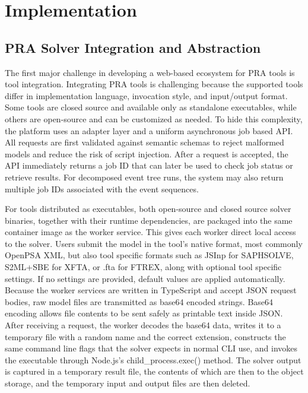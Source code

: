 \chapter{Implementation}

\section{PRA Solver Integration and Abstraction}
The first major challenge in developing a web-based ecosystem for PRA tools is tool integration. Integrating PRA tools is challenging because the supported tools differ in implementation language, invocation style, and input/output format. Some tools are closed source and available only as standalone executables, while others are open-source and can be customized as needed. To hide this complexity, the platform uses an adapter layer and a uniform asynchronous job based API. All requests are first validated against semantic schemas to reject malformed models and reduce the risk of script injection. After a request is accepted, the API immediately returns a job ID that can later be used to check job status or retrieve results. For decomposed event tree runs, the system may also return multiple job IDs associated with the event sequences.

For tools distributed as executables, both open-source and closed source solver binaries, together with their runtime dependencies, are packaged into the same container image as the worker service. This gives each worker direct local access to the solver. Users submit the model in the tool's native format, most commonly OpenPSA XML, but also tool specific formats such as JSInp for SAPHSOLVE, S2ML+SBE for XFTA, or .fta for FTREX, along with optional tool specific settings. If no settings are provided, default values are applied automatically. Because the worker services are written in TypeScript and accept JSON request bodies, raw model files are transmitted as base64 encoded strings. Base64 encoding allows file contents to be sent safely as printable text inside JSON. After receiving a request, the worker decodes the base64 data, writes it to a temporary file with a random name and the correct extension, constructs the same command line flags that the solver expects in normal CLI use, and invokes the executable through Node.js's child\_process.exec() method. The solver output is captured in a temporary result file, the contents of which are then to the object storage, and the temporary input and output files are then deleted.

